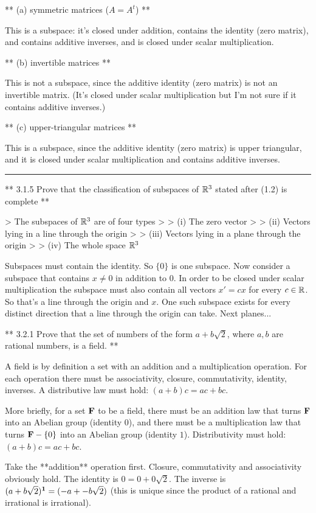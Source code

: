 ** (a) symmetric matrices ($A = A^t$) **

This is a subspace: it's closed under addition, contains the identity (zero
matrix), and contains additive inverses, and is closed under scalar
multiplication.

** (b) invertible matrices **

This is not a subspace, since the additive identity (zero matrix) is not an
invertible matrix. (It's closed under scalar multiplication but I'm not sure if
it contains additive inverses.)

** (c) upper-triangular matrices **

This is a subspace, since the additive identity (zero matrix) is upper
triangular, and it is closed under scalar multiplication and contains additive
inverses.

\hrule

** 3.1.5 Prove that the classification of subspaces of $\mathbb{R}^3$ stated after
(1.2) is complete **

> The subspaces of $\mathbb{R}^3$ are of four types
>
> (i) The zero vector
>
> (ii) Vectors lying in a line through the origin
>
> (iii) Vectors lying in a plane through the origin
>
> (iv) The whole space $\mathbb{R}^3$

Subspaces must contain the identity. So $\{0\}$ is one subspace. Now consider a
subspace that contains $x \neq 0$ in addition to $0$. In order to be closed
under scalar multiplication the subspace must also contain all vectors $x' =
cx$ for every $c \in \mathbb{R}$. So that's a line through the origin and $x$. One such
subspace exists for every distinct direction that a line through the origin can
take. Next planes...


** 3.2.1 Prove that the set of numbers of the form $a + b \sqrt 2$, where $a,
b$ are rational numbers, is a field. **

A field is by definition a set with an addition and a multiplication
operation. For each operation there must be associativity, closure,
commutativity, identity, inverses. A distributive law must hold: $(a + b)c =
ac + bc$.

More briefly, for a set $\mathbf{F}$ to be a field, there must be an addition law that
turns $\mathbf{F}$ into an Abelian group (identity $0$), and there must be a
multiplication law that turns $\mathbf{F} - \{0\}$ into an Abelian group (identity
$1$). Distributivity must hold: $(a + b)c = ac + bc$.

Take the **addition** operation first. Closure, commutativity and associativity
obviously hold. The identity is $0 = 0 + 0\sqrt 2$. The inverse is $(a + b
\sqrt 2)^{\mathbf 1} = (-a + -b \sqrt 2)$ (this is unique since the product of a
rational and irrational is irrational).

